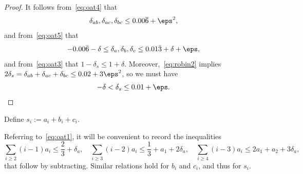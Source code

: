\begin{proof}
  \leanok
  It follows from~\eqref{eq:oat4} that
  \begin{equation*}
  \delta_{ab}, \delta_{ac}, \delta_{bc} \leq 0.00\overline{6} + \eps^2,
  \end{equation*}
  and from~\eqref{eq:oat5} that
  \begin{equation*}
  -0.00\bar 6 - \delta
  \leq \delta_a,\delta_b,\delta_c \leq
  0.01\bar3+\delta+\eps,
  \end{equation*}
  and from~\eqref{eq:oat3} that
  $1-\delta_s\leq 1+\delta. $
  Moreover,~\eqref{eq:robin2} implies $2\delta_s = \delta_{ab}+ \delta_{ac}+ \delta_{bc}\leq 0.02 + 3\eps^2$, so we must have
  \begin{equation*}
    -\delta < \delta_s \leq 0.01+\eps.
  \end{equation*}
\end{proof}

\begin{definition}\label{def:s}
  \leanok
  Define $s_i := a_i + b_i + c_i$.
\end{definition}

Referring to~\eqref{eq:oat1}, it will be convenient to record the inequalities
\begin{equation}\label{eq:ai}
  \sum_{i\ge2} (i-1)a_i \le \frac{2}{3}+\delta_a, \quad \sum_{i\ge3} (i-2)a_i\le\frac{1}{3}+a_1 + 2\delta_a, \quad
  \sum_{i\ge4}(i-3)a_i \le 2a_1+a_2+3\delta_a,
\end{equation}
that follow by subtracting. Similar relations hold for $b_i$ and $c_i$, and thus for $s_i$.


